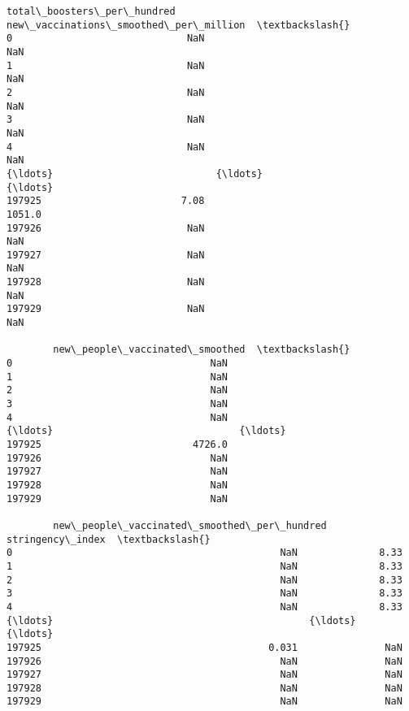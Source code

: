 \documentclass[11pt]{article}
\begin{document}
\begin{tcolorbox}[breakable, size=fbox, boxrule=.5pt, pad at break*=1mm, opacityfill=0]
\begin{Verbatim}[commandchars=\\\{\}]
        total\_boosters\_per\_hundred  new\_vaccinations\_smoothed\_per\_million  \textbackslash{}
0                              NaN                                    NaN
1                              NaN                                    NaN
2                              NaN                                    NaN
3                              NaN                                    NaN
4                              NaN                                    NaN
{\ldots}                            {\ldots}                                    {\ldots}
197925                        7.08                                 1051.0
197926                         NaN                                    NaN
197927                         NaN                                    NaN
197928                         NaN                                    NaN
197929                         NaN                                    NaN

        new\_people\_vaccinated\_smoothed  \textbackslash{}
0                                  NaN
1                                  NaN
2                                  NaN
3                                  NaN
4                                  NaN
{\ldots}                                {\ldots}
197925                          4726.0
197926                             NaN
197927                             NaN
197928                             NaN
197929                             NaN

        new\_people\_vaccinated\_smoothed\_per\_hundred  stringency\_index  \textbackslash{}
0                                              NaN              8.33
1                                              NaN              8.33
2                                              NaN              8.33
3                                              NaN              8.33
4                                              NaN              8.33
{\ldots}                                            {\ldots}               {\ldots}
197925                                       0.031               NaN
197926                                         NaN               NaN
197927                                         NaN               NaN
197928                                         NaN               NaN
197929                                         NaN               NaN


\end{Verbatim}
\end{tcolorbox}
\end{document}
